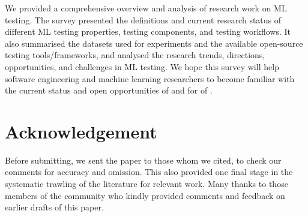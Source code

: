 \label{sec:conclusion}
We provided a comprehensive overview and analysis of research work on ML testing. The survey presented the definitions and current research status of different ML testing properties, testing components, and testing workflows.
It also summarised the datasets used for experiments and the available open-source testing tools/frameworks,
and analysed the research trends, directions, opportunities, and challenges in ML testing.
We hope this survey will help software engineering and machine learning researchers to become familiar with the current status and open opportunities of and for of \mlt{}.
\section*{Acknowledgement}
\label{sec:acknowledgement}
Before submitting, we sent the paper to those whom we cited, to check our comments for accuracy and omission. This also provided one final stage in the systematic trawling of the literature for relevant work. Many thanks to those members of the community who kindly provided comments and feedback on earlier drafts of this paper.
	
	 
